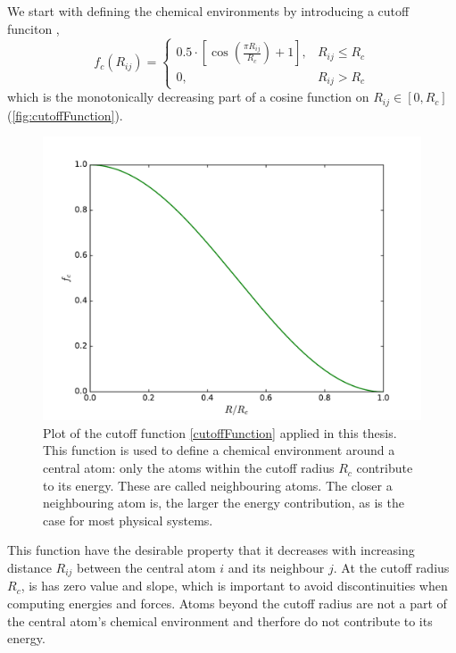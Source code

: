 \documentclass[twoside,english]{uiofysmaster}
\begin{document}
We start with defining the chemical environments by introducing a cutoff funciton \cite{Behler11symmetry},
\begin{equation}
 f_c(R_{ij}) = 
\begin{cases}
0.5 \cdot \left[\cos\left(\frac{\pi R_{ij}}{R_c}\right) + 1 \right], & R_{ij} \leq R_c \\
0, & R_{ij} > R_c
\end{cases}
\label{cutoffFunction}
\end{equation}
which is the monotonically decreasing part of a cosine function on $R_{ij} \in [0,R_c]$ (\autoref{fig:cutoffFunction}). 
\begin{figure}[h]
\begin{center}
  \includegraphics[width = 0.9\linewidth]{Figures/Theory/cutoffFunction.pdf}
  \caption{Plot of the cutoff function \eqref{cutoffFunction} applied in this thesis. 
	   This function is used to define a chemical environment around a central atom:
           only the atoms within the cutoff radius $R_c$ contribute to its energy. 
           These are called neighbouring atoms. The closer a neighbouring atom is, the larger
           the energy contribution, as is the case for most physical systems.}
  \label{fig:cutoffFunction}
  \end{center}
\end{figure}
This function have the desirable property that it decreases with increasing distance $R_{ij}$ between the central
atom $i$ and its neighbour $j$. At the cutoff radius $R_c$, is has zero value and slope, which is important
to avoid discontinuities when computing energies and forces. Atoms beyond the cutoff radius are not a part of the central
atom's chemical environment and therfore do not contribute to its energy. 
\end{document}
